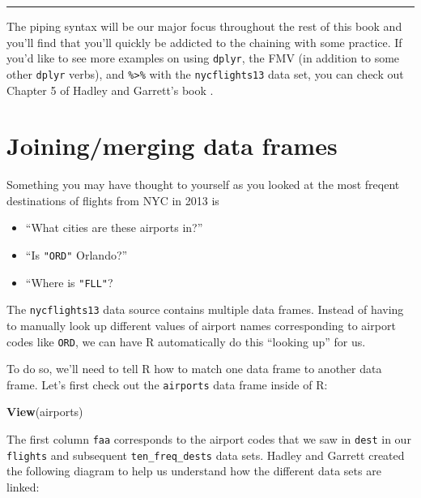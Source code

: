 \documentclass[]{tufte-book}
\newenvironment{Shaded}{\begin{snugshade}}{\end{snugshade}}
\newcommand{\KeywordTok}[1]{\textcolor[rgb]{0.13,0.29,0.53}{\textbf{{#1}}}}
\newcommand{\NormalTok}[1]{{#1}}
\providecommand{\tightlist}{%
  \setlength{\itemsep}{0pt}\setlength{\parskip}{0pt}}
\begin{document}
\begin{center}\rule{\linewidth}{\linethickness}\end{center}

The piping syntax will be our major focus throughout the rest of this
book and you'll find that you'll quickly be addicted to the chaining
with some practice. If you'd like to see more examples on using
\texttt{dplyr}, the FMV (in addition to some other \texttt{dplyr}
verbs), and \texttt{\%\textgreater{}\%} with the \texttt{nycflights13}
data set, you can check out Chapter 5 of Hadley and Garrett's book
\citep{rds2016}.

\section{Joining/merging data frames}\label{joiningmerging-data-frames}

Something you may have thought to yourself as you looked at the most
freqent destinations of flights from NYC in 2013 is

\begin{itemize}
\tightlist
\item
  ``What cities are these airports in?''
\item
  ``Is \texttt{"ORD"} Orlando?''
\item
  ``Where is \texttt{"FLL"}?
\end{itemize}

The \texttt{nycflights13} data source contains multiple data frames.
Instead of having to manually look up different values of airport names
corresponding to airport codes like \texttt{ORD}, we can have R
automatically do this ``looking up'' for us.

To do so, we'll need to tell R how to match one data frame to another
data frame. Let's first check out the \texttt{airports} data frame
inside of R:

\begin{Shaded}
\begin{Highlighting}[]
\KeywordTok{View}\NormalTok{(airports)}
\end{Highlighting}
\end{Shaded}

The first column \texttt{faa} corresponds to the airport codes that we
saw in \texttt{dest} in our \texttt{flights} and subsequent
\texttt{ten\_freq\_dests} data sets. Hadley and Garrett \citep{rds2016}
created the following diagram to help us understand how the different
data sets are linked:
\end{document}

